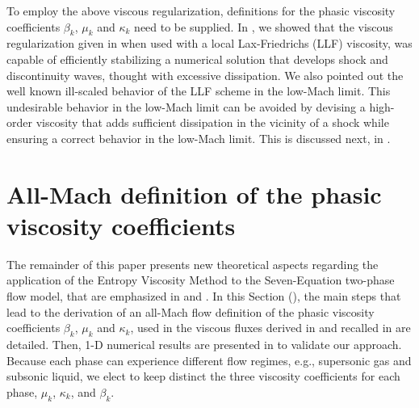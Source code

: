 \documentclass[preprint,10pt]{elsarticle}
\begin{document}
%
To employ the above viscous regularization, definitions for the phasic viscosity coefficients $\beta_k$, $\mu_k$ and $\kappa_k$ need to be supplied. 
In \cite{Marco_paper_sem}, we showed that the viscous regularization given in  when used with a local Lax-Friedrichs (LLF) 
viscosity, was capable of efficiently stabilizing a numerical solution that develops shock and discontinuity waves, thought with excessive dissipation. 
We also pointed out the well known ill-scaled behavior of the LLF scheme in the low-Mach limit. This undesirable behavior in the low-Mach limit can be avoided 
by devising a high-order viscosity that adds sufficient dissipation in the vicinity of a shock while ensuring a correct behavior in the low-Mach limit. 
This is discussed next, in .
%  
\section{All-Mach definition of the phasic viscosity coefficients}\label{sec:visc-def}
%
 
%
The remainder of this paper presents new theoretical aspects regarding the application of the Entropy Viscosity Method to the Seven-Equation two-phase flow model, that are emphasized in  and . In this Section (), the main steps that lead to the derivation of an all-Mach flow definition of the phasic viscosity coefficients $\beta_k$, $\mu_k$ and $\kappa_k$, used in the viscous fluxes derived in \cite{Marco_paper_sem} and recalled in  are detailed. Then, 1-D numerical results are presented in  to validate our approach. Because each phase can experience different flow regimes, e.g., supersonic gas and subsonic liquid, we elect to keep distinct the three viscosity 
coefficients for each phase, $\mu_k$, $\kappa_k$, and $\beta_k$.
\end{document}
